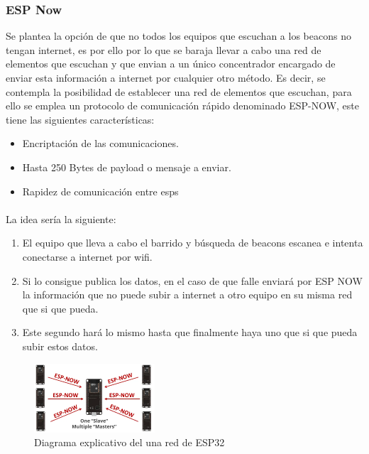 \documentclass[a4paper ,12pt, onecolumn]{article}
\begin{document}
\begin{enumerate}
        \subsubsection {ESP Now}
            Se plantea la opción de que no todos los equipos que escuchan a los beacons no tengan internet, es por ello por lo 
            que se baraja llevar a cabo una red de elementos que escuchan y que envian a un único concentrador encargado de enviar
            esta información a internet por cualquier otro método.
            Es decir, se contempla la posibilidad de establecer una red de elementos que escuchan, para ello se emplea 
            un protocolo de comunicación rápido denominado ESP-NOW, este tiene las siguientes características:
            \begin{itemize}
                \item Encriptación de las comunicaciones.
                \item Hasta 250 Bytes de payload o mensaje a enviar.
                \item Rapidez de comunicación entre esps
            \end{itemize}
            \paragraph{}
            La idea sería la siguiente:
            \begin{enumerate}
                \item El equipo que lleva a cabo el barrido y búsqueda de beacons escanea e intenta conectarse a 
                internet por wifi.
                \item Si lo consigue publica los datos, en el caso de que falle enviará por ESP NOW la información
                que no puede subir a internet a otro equipo en su misma red que si que pueda.
                \item Este segundo hará lo mismo hasta que finalmente haya uno que si que pueda subir estos datos.
            \end{enumerate}
            \begin{center}
                \begin{figure}[ht]
                    \centering
                    \includegraphics[width=0.4\textwidth]{espnow.PNG}
                    \caption{Diagrama explicativo del una red de ESP32}
                    \label{fig:mesh4}
                \end{figure}
            \end{center}
        \end{enumerate}
\end{document}
